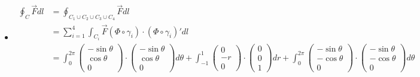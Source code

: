 \documentclass[11pt]{article}
\begin{document}
\begin{solution}
\begin{itemize}
	\begin{align*}
	&\gamma_1: [0,2\pi) \mapsto \partial \Omega_1, (\theta) \mapsto (\theta, -1)\\
	&\gamma_2: [-1,1) \mapsto \partial \Omega_2, (r) \mapsto (2\pi, r)\\
	&\gamma_3: [0,2\pi) \mapsto \partial \Omega_3, (\theta) \mapsto (2\pi - \theta, 1)\\
	&\gamma_4: [-1,1) \mapsto \partial \Omega_4, (r) \mapsto (0, -r)\\
	\end{align*}
	which we can use to build a parameterization of the curve $C = \partial S$:
	\begin{align*}
	&\Phi \circ \gamma_1: [0,2\pi) \mapsto C_1, (\theta) \mapsto (\cos \theta, \sin \theta, -1)\\
	&\Phi \circ \gamma_2: [1,-1)  \mapsto C_2, (r) \mapsto (1, 0, r)\\
	&\Phi \circ \gamma_3: [0,2\pi) \mapsto C_3, (\theta) \mapsto (\cos \theta, -\sin \theta, 1)\\
	&\Phi \circ \gamma_4: [-1,1) \mapsto C_4, (r) \mapsto (1, 0, -r)\\
	\end{align*}
    \item 
	\begin{align*}
	\oint_C \vec F dl 
	&= 
	\oint_{C_1 \cup C_2 \cup C_3\cup C_4} \vec F dl
	\\
	&= 
	\sum_{i = 1}^4\int_{C_i} \vec F(\Phi\circ \gamma_i) \cdot (\Phi\circ \gamma_i)'dl 
	\\
	&= \int_0^{2\pi} \begin{pmatrix}-\sin \theta\\\cos \theta\\0\end{pmatrix}\cdot\begin{pmatrix}-\sin \theta\\\cos \theta\\ 0\end{pmatrix}d\theta 
	+ 
	\int_{-1}^{1} \begin{pmatrix}0\\-r\\0\end{pmatrix}\cdot\begin{pmatrix}0\\0\\1\end{pmatrix}dr 
	+ 
	\int_0^{2\pi} \begin{pmatrix}-\sin \theta\\ -\cos \theta\\0\end{pmatrix}\cdot\begin{pmatrix}-\sin \theta\\-\cos \theta\\ 0\end{pmatrix}d\theta 

\end{align*}
\end{itemize}
\end{solution}
\end{document}
